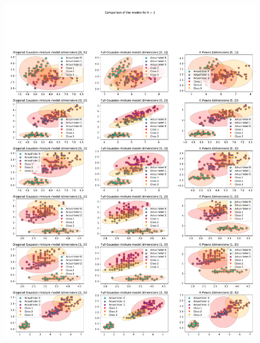 \documentclass[a4paper, 11pt]{article}
\begin{document}
\begin{enumerate}
        \begin{figure}
            \centering
            \includegraphics[width=1\textwidth]{probabilistic_graphical_models/HW2/images/iris_GM_KM_3.pdf}
            \caption{}
            \label{fig:iris3}
        \end{figure}
        

\end{enumerate}
\end{document}
